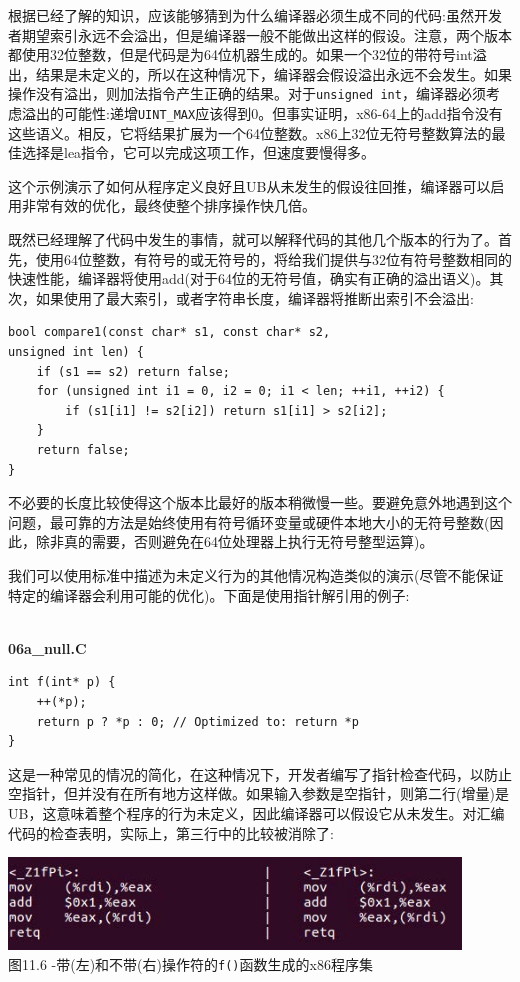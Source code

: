 根据已经了解的知识，应该能够猜到为什么编译器必须生成不同的代码:虽然开发者期望索引永远不会溢出，但是编译器一般不能做出这样的假设。注意，两个版本都使用32位整数，但是代码是为64位机器生成的。如果一个32位的带符号int溢出，结果是未定义的，所以在这种情况下，编译器会假设溢出永远不会发生。如果操作没有溢出，则加法指令产生正确的结果。对于\texttt{unsigned int}，编译器必须考虑溢出的可能性:递增\texttt{UINT\_MAX}应该得到0。但事实证明，x86-64上的add指令没有这些语义。相反，它将结果扩展为一个64位整数。x86上32位无符号整数算法的最佳选择是lea指令，它可以完成这项工作，但速度要慢得多。

这个示例演示了如何从程序定义良好且UB从未发生的假设往回推，编译器可以启用非常有效的优化，最终使整个排序操作快几倍。

既然已经理解了代码中发生的事情，就可以解释代码的其他几个版本的行为了。首先，使用64位整数，有符号的或无符号的，将给我们提供与32位有符号整数相同的快速性能，编译器将使用add(对于64位的无符号值，确实有正确的溢出语义)。其次，如果使用了最大索引，或者字符串长度，编译器将推断出索引不会溢出:

\begin{lstlisting}[style=styleCXX]
bool compare1(const char* s1, const char* s2,
unsigned int len) {
	if (s1 == s2) return false;
	for (unsigned int i1 = 0, i2 = 0; i1 < len; ++i1, ++i2) {
		if (s1[i1] != s2[i2]) return s1[i1] > s2[i2];
	}
	return false;
}
\end{lstlisting}

不必要的长度比较使得这个版本比最好的版本稍微慢一些。要避免意外地遇到这个问题，最可靠的方法是始终使用有符号循环变量或硬件本地大小的无符号整数(因此，除非真的需要，否则避免在64位处理器上执行无符号整型运算)。

我们可以使用标准中描述为未定义行为的其他情况构造类似的演示(尽管不能保证特定的编译器会利用可能的优化)。下面是使用指针解引用的例子:

\hspace*{\fill} \\ %
\noindent
\textbf{06a\_null.C}
\begin{lstlisting}[style=styleCXX]
int f(int* p) {
	++(*p);
	return p ? *p : 0; // Optimized to: return *p
}
\end{lstlisting}

这是一种常见的情况的简化，在这种情况下，开发者编写了指针检查代码，以防止空指针，但并没有在所有地方这样做。如果输入参数是空指针，则第二行(增量)是UB，这意味着整个程序的行为未定义，因此编译器可以假设它从未发生。对汇编代码的检查表明，实际上，第三行中的比较被消除了:

\begin{center}
\includegraphics[width=0.9\textwidth]{content/3/chapter11/images/6.jpg}\\
图11.6 -带(左)和不带(右)操作符的\texttt{f()}函数生成的x86程序集
\end{center}

